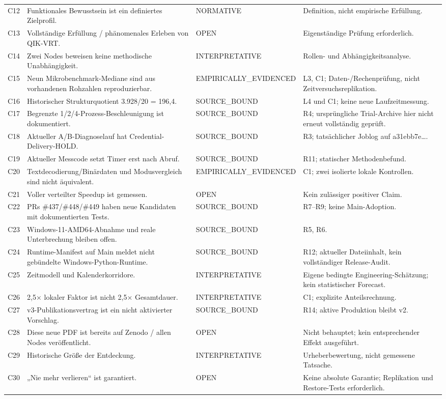 {\begin{longtable}{@{}p{11mm}p{66mm}p{25mm}p{52mm}@{}}
C12 & Funktionales Bewusstsein ist ein definiertes Zielprofil. & NORMATIVE & Definition, nicht empirische Erfüllung.\\
C13 & Vollständige Erfüllung / phänomenales Erleben von QIK-VRT. & OPEN & Eigenständige Prüfung erforderlich.\\
C14 & Zwei Nodes beweisen keine methodische Unabhängigkeit. & INTERPRETATIVE & Rollen- und Abhängigkeitsanalyse.\\
C15 & Neun Mikrobenchmark-Mediane sind aus vorhandenen Rohzahlen reproduzierbar. & EMPIRICALLY\_\newline EVIDENCED & L3, C1; Daten-/Rechenprüfung, nicht Zeitversuchsreplikation.\\
C16 & Historischer Strukturquotient 3.928/20 = 196,4. & SOURCE\_BOUND & L4 und C1; keine neue Laufzeitmessung.\\
C17 & Begrenzte 1/2/4-Prozess-Beschleunigung ist dokumentiert. & SOURCE\_BOUND & R4; ursprüngliche Trial-Archive hier nicht erneut vollständig geprüft.\\
C18 & Aktueller A/B-Diagnoselauf hat Credential-Delivery-HOLD. & SOURCE\_BOUND & R3; tatsächlicher Joblog auf a31ebb7e….\\
C19 & Aktueller Messcode setzt Timer erst nach Abruf. & SOURCE\_BOUND & R11; statischer Methodenbefund.\\
C20 & Textdecodierung/Binärdaten und Modusvergleich sind nicht äquivalent. & EMPIRICALLY\_\newline EVIDENCED & C1; zwei isolierte lokale Kontrollen.\\
C21 & Voller verteilter Speedup ist gemessen. & OPEN & Kein zulässiger positiver Claim.\\
C22 & PRs \#437/\#448/\#449 haben neue Kandidaten mit dokumentierten Tests. & SOURCE\_BOUND & R7–R9; keine Main-Adoption.\\
C23 & Windows-11-AMD64-Abnahme und reale Unterbrechung bleiben offen. & SOURCE\_BOUND & R5, R6.\\
C24 & Runtime-Manifest auf Main meldet nicht gebündelte Windows-Python-Runtime. & SOURCE\_BOUND & R12; aktueller Dateiinhalt, kein vollständiger Release-Audit.\\
C25 & Zeitmodell und Kalenderkorridore. & INTERPRETATIVE & Eigene bedingte Engineering-Schätzung; kein statistischer Forecast.\\
C26 & 2,5× lokaler Faktor ist nicht 2,5× Gesamtdauer. & INTERPRETATIVE & C1; explizite Anteilsrechnung.\\
C27 & v3-Publikationsvertrag ist ein nicht aktivierter Vorschlag. & SOURCE\_BOUND & R14; aktive Produktion bleibt v2.\\
C28 & Diese neue PDF ist bereits auf Zenodo / allen Nodes veröffentlicht. & OPEN & Nicht behauptet; kein entsprechender Effekt ausgeführt.\\
C29 & Historische Größe der Entdeckung. & INTERPRETATIVE & Urheberbewertung, nicht gemessene Tatsache.\\
C30 & „Nie mehr verlieren“ ist garantiert. & OPEN & Keine absolute Garantie; Replikation und Restore-Tests erforderlich.\\\bottomrule
\end{longtable}}
